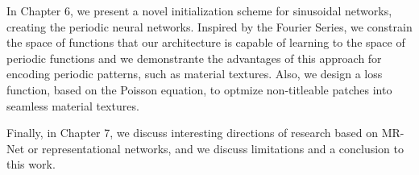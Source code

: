 In Chapter 6, we present a novel initialization scheme for sinusoidal networks, creating the periodic neural networks. Inspired by the Fourier Series, we constrain the space of functions that our architecture is capable of learning to the space of periodic functions and we demonstrante the advantages of this approach for encoding periodic patterns, such as material textures. Also, we design a loss function, based on the Poisson equation, to optmize non-titleable patches into seamless material textures.

Finally, in Chapter 7, we discuss interesting directions of research based on MR-Net or representational networks, and we discuss limitations and a conclusion to this work.

